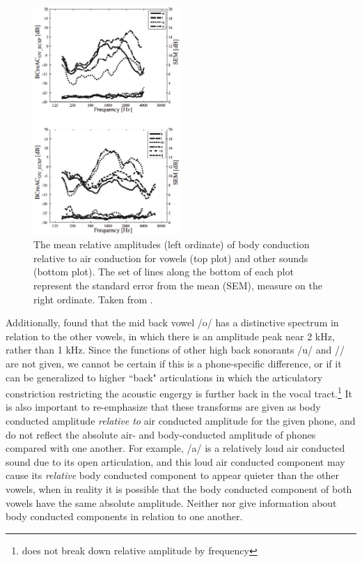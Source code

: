 \documentclass[dissertation,copyright]{uathesis}
\begin{document}
\begin{figure}
\includegraphics[width=0.5\textwidth]{figure/BC_rel_AC_all.png}
\caption{The mean relative amplitudes (left ordinate) of body conduction relative to air conduction for vowels (top plot) and other sounds (bottom plot).  The set of lines along the bottom of each plot represent the standard error from the mean (SEM), measure on the right ordinate.  Taken from \cite{reinfeldt:10}.}
\label{BCrelACall}
\end{figure}


Additionally, \cite{reinfeldt:10} found that the mid back vowel /o/ has a distinctive spectrum in relation to the other vowels, in which there is an amplitude peak near 2 kHz, rather than 1 kHz.  Since the functions of other high back sonorants /u/ and // are not given, we cannot be certain if this is a phone-specific difference, or if it can be generalized to higher ``back" articulations in which the articulatory constriction restricting the acoustic engergy is further back in the vocal tract.\footnote{\cite{bekesy:60} does not break down relative amplitude by frequency}  It is also important to re-emphasize that these transforms are given as body conducted amplitude \textit{relative to} air conducted amplitude for the given phone, and do not reflect the absolute air- and body-conducted amplitude of phones compared with one another.  For example, /a/ is a relatively loud air conducted sound due to its open articulation, and this loud air conducted component may cause its \textit{relative} body conducted component to appear quieter than the other vowels, when in reality it is possible that the body conducted component of both vowels have the same absolute amplitude.  Neither \cite{bekesy:60} nor \cite{reinfeldt:10} give information about body conducted components in relation to one another.
\end{document}
